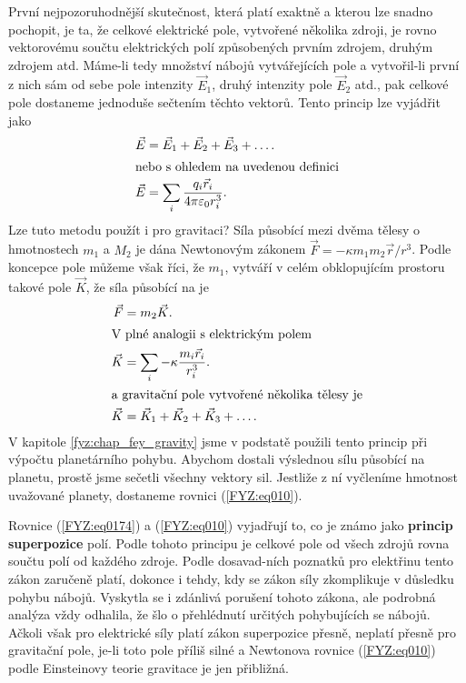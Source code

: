     První nejpozoruhodnější skutečnost, která platí exaktně a kterou lze snadno pochopit, je ta, že 
    celkové elektrické pole, vytvořené několika zdroji, je rovno vektorovému součtu elektrických 
    polí způsobených prvním zdrojem, druhým zdrojem atd. Máme-li tedy množství nábojů vytvářejících 
    pole a vytvořil-li první z nich sám od sebe pole intenzity \(\vec{E}_1\), druhý intenzity pole 
    \(\vec{E}_2\) atd., pak celkové pole dostaneme jednoduše sečtením těchto vektorů. Tento princip 
    lze vyjádřit jako
    \begin{align}
      \vec{E} &= \vec{E}_1 + \vec{E}_2 + \vec{E}_3 + \ldots.                  \label{FYZ:eq0174} \\
      \shortintertext{nebo s ohledem na uvedenou definici}
      \vec{E} &= \sum_i\frac{q_i\vec{r}_i}{4\pi\varepsilon_0r_i^3}.           \label{FYZ:eq0175}
    \end{align}
    Lze tuto metodu použít i pro gravitaci? Síla působící mezi dvěma tělesy o hmotnostech \(m_1\) a 
    \(M_2\) je dána Newtonovým zákonem \(\vec{F} = -\kappa m_1m_2\vec{r}/r^3\). Podle koncepce pole 
    můžeme však říci, že \(m_1\), vytváří v celém obklopujícím prostoru takové pole \(\vec{K}\), že 
    síla působící na je
    \begin{align}
      \vec{F} &= m_2\vec{K}.                                                \label{FYZ:eq0176}  \\
      \shortintertext{V plné analogii s elektrickým polem}
      \vec{K} &= \sum_i-\kappa\frac{m_i\vec{r}_i}{r_i^3}.                   \label{FYZ:eq0177}  \\
      \shortintertext{a gravitační pole vytvořené několika tělesy je}
      \vec{K} &= \vec{K}_1 + \vec{K}_2 + \vec{K}_3 + \ldots.                \label{FYZ:eq010}
    \end{align}
    V kapitole \ref{fyz:chap_fey_gravity} jsme v podstatě použili tento princip při výpočtu 
    planetárního pohybu. Abychom dostali výslednou sílu působící na planetu, prostě jsme sečetli 
    všechny vektory sil. Jestliže z ní vyčleníme hmotnost uvažované planety, dostaneme rovnici 
    (\ref{FYZ:eq010}).
    
    Rovnice (\ref{FYZ:eq0174}) a (\ref{FYZ:eq010}) vyjadřují to, co je známo jako \textbf{princip 
    superpozice} polí. Podle tohoto principu je celkové pole od všech zdrojů rovna součtu polí od 
    každého zdroje. Podle dosavad-ních poznatků pro elektřinu tento zákon zaručeně platí, dokonce i 
    tehdy, kdy se zákon síly zkomplikuje v důsledku pohybu nábojů. Vyskytla se i zdánlivá porušení 
    tohoto zákona, ale podrobná analýza vždy odhalila, že šlo o přehlédnutí určitých pohybujících 
    se nábojů. Ačkoli však pro elektrické síly platí zákon superpozice přesně, neplatí přesně pro 
    gravitační pole, je-li toto pole příliš silné a Newtonova rovnice (\ref{FYZ:eq010}) podle 
    Einsteinovy teorie gravitace je jen přibližná.
    
